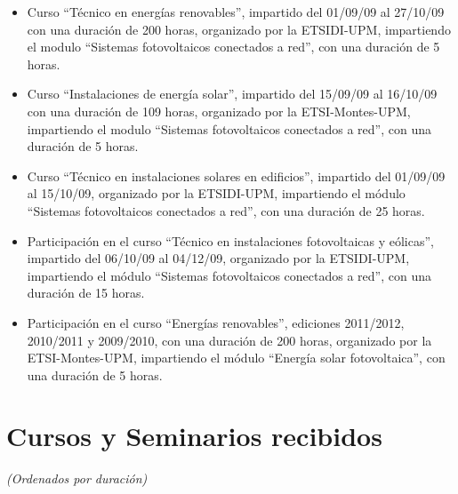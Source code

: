 \documentclass[article, a4paper]{memoir}
\begin{document}
\begin{itemize}
\item Curso ``Técnico en energías renovables'', impartido del 01/09/09 al 27/10/09 con una duración de 200 horas, organizado por la ETSIDI-UPM, impartiendo el modulo ``Sistemas fotovoltaicos conectados a red'', con una duración de 5 horas.

\item Curso ``Instalaciones de energía solar'', impartido del 15/09/09 al 16/10/09 con una duración de 109 horas, organizado por la ETSI-Montes-UPM, impartiendo el modulo ``Sistemas fotovoltaicos conectados a red'', con una duración de 5 horas.

\item Curso ``Técnico en instalaciones solares en edificios'', impartido del 01/09/09 al 15/10/09, organizado por la ETSIDI-UPM, impartiendo el módulo ``Sistemas fotovoltaicos conectados a red'', con una duración de 25 horas.

\item Participación en el curso ``Técnico en instalaciones fotovoltaicas y eólicas'', impartido del 06/10/09 al 04/12/09, organizado por la ETSIDI-UPM, impartiendo el módulo ``Sistemas fotovoltaicos conectados a red'', con una duración de 15 horas.

\item Participación en el curso ``Energías renovables'', ediciones 2011/2012, 2010/2011 y 2009/2010, con una duración de 200 horas, organizado por la ETSI-Montes-UPM, impartiendo el módulo ``Energía solar fotovoltaica'', con una duración de 5 horas.
\end{itemize}

\section{Cursos y Seminarios recibidos}
\label{sec:orgheadline80}

\emph{(Ordenados por duración)}
\end{document}
